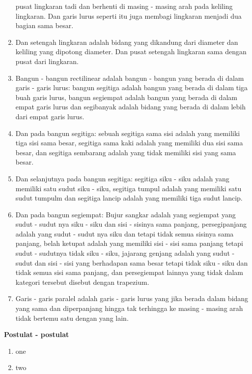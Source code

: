 \documentclass[a4paper, 12pt]{book}
\begin{document}
\begin{enumerate}
pusat lingkaran tadi dan berhenti di masing - masing arah pada
keliling lingkaran. Dan garis lurus seperti itu juga membagi lingkaran 
menjadi dua bagian sama besar.
\item Dan setengah lingkaran adalah bidang yang dikandung dari diameter dan 
keliling yang dipotong diameter. Dan pusat setengah lingkaran sama dengan 
pusat dari lingkaran.
\item Bangun - bangun rectilinear adalah bangun - bangun yang berada di dalam
garis - garis lurus: bangun segitiga adalah bangun yang berada di dalam tiga buah
garis lurus, bangun segiempat adalah bangun yang berada di dalam empat garis lurus dan 
segibanyak adalah bidang yang berada di dalam lebih dari empat garis lurus.
\item Dan pada bangun segitiga: sebuah segitiga sama sisi adalah yang memiliki tiga
sisi sama besar, segitiga sama kaki adalah yang memiliki dua sisi sama besar, dan 
segitiga sembarang adalah yang tidak memiliki sisi yang sama besar.
\item Dan selanjutnya pada bangun segitiga: segitiga siku - siku adalah yang memiliki
satu sudut siku - siku, segitiga tumpul adalah yang memiliki satu sudut tumpulm dan 
segitiga lancip adalah yang memiliki tiga sudut lancip.
\item Dan pada bangun segiempat: Bujur sangkar adalah yang segiempat yang
sudut - sudut nya siku - siku dan sisi - sisinya sama panjang, persegipanjang
adalah yang sudut - sudut nya siku dan tetapi tidak semua sisinya sama panjang, 
belah ketupat adalah yang memiliki sisi - sisi sama panjang tetapi
sudut - sudutnya tidak siku - siku, jajarang genjang adalah yang sudut - sudut 
dan sisi - sisi yang berhadapan sama besar tetapi tidak siku - siku dan tidak 
semua sisi sama panjang, dan persegiempat lainnya yang tidak dalam kategori tersebut
disebut dengan trapezium.
\item Garis - garis paralel adalah garis - garis lurus yang jika berada dalam 
bidang yang sama dan diperpanjang hingga tak terhingga ke masing - masing arah
tidak bertemu satu dengan yang lain.  
\end{enumerate}

\begin{center}
\textbf{Postulat - postulat}
\end{center}
\begin{enumerate}
\item one
\item two
\end{enumerate}
\end{document}
